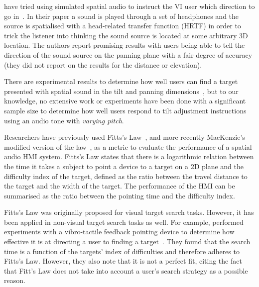 \documentclass[format=sigconf, review=true, screen=true, anonymous=true]{acmart}
\begin{document}
\citeauthor{holland2002audiogps} have tried using simulated spatial audio to instruct the VI user which direction to go in~\cite{holland2002audiogps}. In their paper a sound is played through a set of headphones and the source is spatialised with a head-related transfer function (HRTF) in order to trick the listener into thinking the sound source is located at some arbitrary 3D location. The authors report promising results with users being able to tell the direction of the sound source on the panning plane with a fair degree of accuracy (they did not report on the results for the distance or elevation). %

There are experimental results to determine how well users can find a target presented with spatial sound in the tilt and panning dimensions~\cite{katz2011spatial, zwiers2001spatial}, but to our knowledge, no extensive work or experiments have been done with a significant sample size to determine how well users respond to tilt adjustment instructions using an audio tone with \emph{varying pitch}. %

Researchers have previously used Fitts's Law~\cite{fitts1954information}, and more recently MacKenzie's modified version of the law~\cite{mackenzie1992fitts}, as a metric to evaluate the performance of a spatial audio HMI system. Fitts's Law states that there is a logarithmic relation between the time it takes a subject to point a device to a target on a 2D plane and the difficulty index of the target, defined as the ratio between the travel distance to the target and the width of the target. The performance of the HMI can be summarised as the ratio between the pointing time and the difficulty index. 


Fitts's Law was originally proposed for visual target search tasks. However, it has been applied in non-visual target search tasks as well. For example, \citeauthor{ahmaniemi2009augmented} performed experiments with a vibro-tactile feedback pointing device to determine how effective it is at directing a user to finding a target~\cite{ahmaniemi2009augmented}. They found that the search time is a function of the targets' index of difficulties and therefore adheres to Fitts's Law. However, they also note that it is not a perfect fit, citing the fact that Fitt's Law does not take into account a user's search strategy as a possible reason. 
\end{document}
